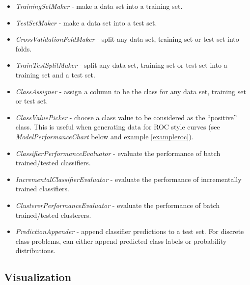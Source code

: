 \documentclass[a4paper]{article}
\begin{document}
\begin{itemize}
	\item \textit{TrainingSetMaker} - make a data set into a training set.
	\item \textit{TestSetMaker} - make a data set into a test set.
	\item \textit{CrossValidationFoldMaker} - split any data set, training 
	set or test set into folds.
	\item \textit{TrainTestSplitMaker} - split any data set, training set 
	or test set into a training set and a test set.
	\item \textit{ClassAssigner} - assign a column to be the class for any 
	data set, training set or test set.
	\item \textit{ClassValuePicker} - choose a class value to be considered 
	as the ``positive'' class. This is useful when generating data for ROC style 
	curves (see \textit{ModelPerformanceChart} below and example \ref{exampleroc}).
	\item \textit{ClassifierPerformanceEvaluator} - evaluate the performance of 
	batch trained/tested classifiers.
	\item \textit{IncrementalClassifierEvaluator} - evaluate the performance of 
	incrementally trained classifiers.
	\item \textit{ClustererPerformanceEvaluator} - evaluate the performance of 
	batch trained/tested clusterers.
	\item \textit{PredictionAppender} - append classifier predictions to a test 
	set. For discrete class problems, can either append predicted class labels or
	probability distributions.
\end{itemize}

\newpage
\subsection{Visualization}
\begin{center}
\end{center}
\end{document}
